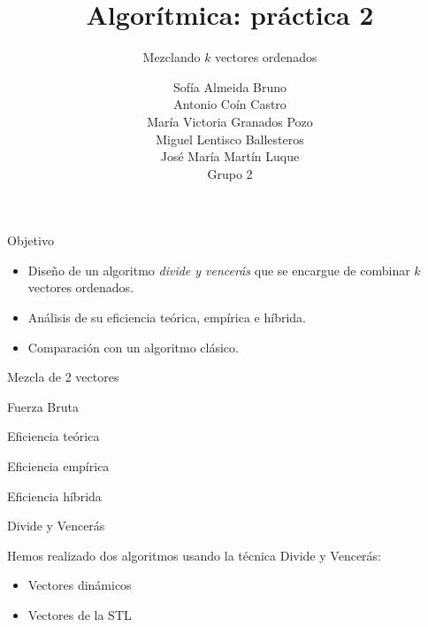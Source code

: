 \documentclass[spanish]{beamer}
\title{Algorítmica: práctica 2}
\subtitle{Mezclando $k$ vectores ordenados}
\author{Sofía Almeida Bruno\\ Antonio Coín Castro\\ María Victoria Granados Pozo\\ Miguel Lentisco Ballesteros\\ José María Martín Luque\\ \vspace{1em}Grupo 2}
\begin{document}
\maketitle

\begin{frame}{Objetivo}

	\begin{itemize}
		\item Diseño de un algoritmo \textit{divide y vencerás} que se encargue de combinar $k$ vectores ordenados. 
		\item Análisis de su eficiencia teórica, empírica e híbrida.
		\item Comparación con un algoritmo clásico.
	\end{itemize}

\end{frame}



\begin{frame}{Mezcla de 2 vectores}

	
\end{frame}


\begin{frame}{Fuerza Bruta}
	
\end{frame}



\begin{frame}{Eficiencia teórica}


\end{frame}

\begin{frame}{Eficiencia empírica}
	\begin{center}
		\resizebox*{11cm}{!}{
			}
	\end{center}

\end{frame}

\begin{frame}{Eficiencia híbrida}
  \fontsize{8pt}{7.2}\selectfont
	\begin{center}
	\resizebox*{11cm}{!}{
		
	}
	\end{center}
\end{frame}


\begin{frame}{Divide y Vencerás}

	Hemos realizado dos algoritmos usando la técnica Divide y Vencerás:
	\begin{itemize}
		\item Vectores dinámicos
		\item Vectores de la STL
	\end{itemize}
\end{frame}
\end{document}
